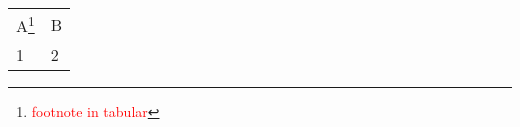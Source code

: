 \documentclass{article}
\begin{document}
\pagestyle{empty}

\noindent
\begin{tabular}{ll}
	A\footnote{
		\textcolor{red}{footnote in tabular}
	} & B \\
	1 & 2 \\
\end{tabular}
\end{document}
